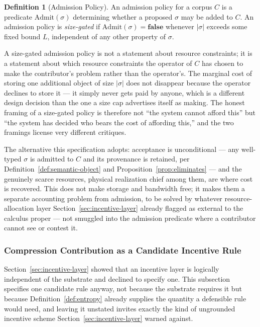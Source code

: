 \documentclass[11pt]{article}
\theoremstyle{definition}
\newtheorem{definition}[theorem]{Definition}
\begin{document}
\begin{definition}[Admission Policy]
\label{def:admission-policy}
An admission policy for a corpus $C$ is a predicate $\mathrm{Admit}(\sigma)$ determining whether a proposed $\sigma$ may be added to $C$. An admission policy is \emph{size-gated} if $\mathrm{Admit}(\sigma) = \mathbf{false}$ whenever $|\sigma|$ exceeds some fixed bound $L$, independent of any other property of $\sigma$.
\end{definition}

A size-gated admission policy is not a statement about resource constraints; it is a statement about which resource constraints the operator of $C$ has chosen to make the contributor's problem rather than the operator's. The marginal cost of storing one additional object of size $|\sigma|$ does not disappear because the operator declines to store it --- it simply never gets paid by anyone, which is a different design decision than the one a size cap advertises itself as making. The honest framing of a size-gated policy is therefore not ``the system cannot afford this'' but ``the system has decided who bears the cost of affording this,'' and the two framings license very different critiques.

The alternative this specification adopts: acceptance is unconditional --- any well-typed $\sigma$ is admitted to $C$ and its provenance is retained, per Definition~\ref{def:semantic-object} and Proposition~\ref{prop:eliminates} --- and the genuinely scarce resources, physical realization chief among them, are where cost is recovered. This does not make storage and bandwidth free; it makes them a separate accounting problem from admission, to be solved by whatever resource-allocation layer Section~\ref{sec:incentive-layer} already flagged as external to the calculus proper --- not smuggled into the admission predicate where a contributor cannot see or contest it.

\subsubsection{Compression Contribution as a Candidate Incentive Rule}
\label{sec:compression-contribution}

Section~\ref{sec:incentive-layer} showed that an incentive layer is logically independent of the substrate and declined to specify one. This subsection specifies one candidate rule anyway, not because the substrate requires it but because Definition~\ref{def:entropy} already supplies the quantity a defensible rule would need, and leaving it unstated invites exactly the kind of ungrounded incentive scheme Section~\ref{sec:incentive-layer} warned against.
\end{document}
